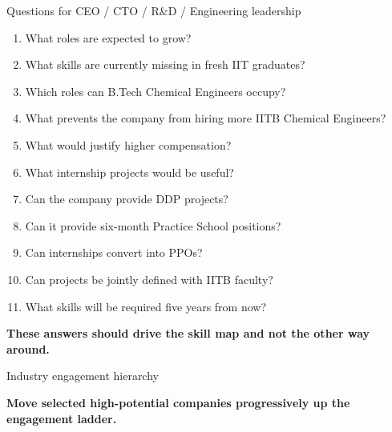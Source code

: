 \documentclass[aspectratio=169,11pt]{beamer}
\newcommand{\key}[1]{\textbf{\color{IITblue}#1}}
\begin{document}
\begin{frame}{Questions for CEO / CTO / R\&D / Engineering leadership}
\begin{enumerate}
\item What roles are expected to grow?
\item What skills are currently missing in fresh IIT graduates?
\item Which roles can B.Tech Chemical Engineers occupy?
\item What prevents the company from hiring more IITB Chemical Engineers?
\item What would justify higher compensation?
\item What internship projects would be useful?
\item Can the company provide DDP projects?
\item Can it provide six-month Practice School positions?
\item Can internships convert into PPOs?
\item Can projects be jointly defined with IITB faculty?
\item What skills will be required five years from now?
\end{enumerate}
\vspace{2mm}
\centering\key{These answers should drive the skill map and not the other way around.}
\end{frame}

\begin{frame}{Industry engagement hierarchy}
\centering
{}
\vspace{3mm}
\centering\key{Move selected high-potential companies progressively up the engagement ladder.}
\end{frame}
\end{document}
